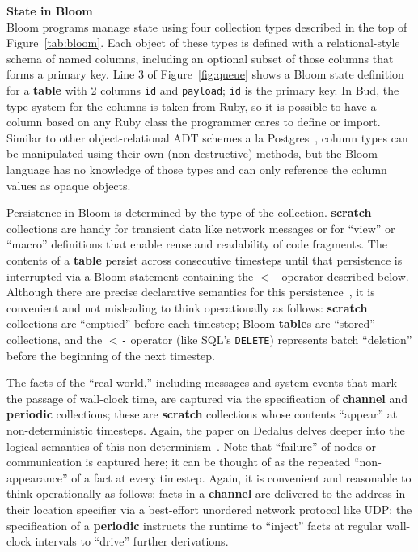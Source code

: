 \noindent\textbf{State in Bloom}\\
\noindent
Bloom programs manage state using four collection types described in the top of Figure~\ref{tab:bloom}. Each object of these types is defined with a relational-style schema of named columns, including an optional subset of those columns that forms a primary key.  Line 3 of Figure~\ref{fig:queue} shows a Bloom state definition for a \textbf{table} with 2 columns \texttt{id} and \texttt{payload}; \texttt{id} is the primary key.  In Bud, the type system for the columns is taken from Ruby, so it is possible to have a column based on any Ruby class the programmer cares to define or import.  Similar to other object-relational ADT schemes a la Postgres~\cite{postgres-adt}, column types can be manipulated using their own (non-destructive) methods, but the Bloom language has no knowledge of those types and can only reference the column values as opaque objects.  

Persistence in Bloom is determined by the type of the collection.  \textbf{scratch} collections are handy for transient data like network messages or for ``view'' or ``macro'' definitions that enable reuse and readability of code fragments.  The contents of a \textbf{table} persist across consecutive timesteps until that persistence is interrupted via a Bloom statement containing the \texttt{$<$-} operator described below. Although there are precise declarative semantics for this persistence~\cite{dedalus-techr}, it is convenient and not misleading to think operationally as follows: \textbf{scratch} collections are ``emptied'' before each timestep; Bloom \textbf{table}s are ``stored'' collections, and the \texttt{$<$-} operator (like SQL's \texttt{DELETE}) represents batch ``deletion'' before the beginning of the next timestep.

The facts of the ``real world,'' including messages and system events that mark the passage of wall-clock time, are captured via the specification of \textbf{channel} and \textbf{periodic} collections; these are \textbf{scratch} collections whose contents ``appear'' at non-deterministic timesteps. 
Again, the paper on Dedalus delves deeper into the logical semantics of this non-determinism~\cite{dedalus-techr}.  Note that ``failure'' of nodes or communication is captured here; it can be thought of as the repeated ``non-appearance'' of a fact at every timestep.  Again, it is convenient and reasonable to think operationally as follows: facts in a \textbf{channel} are delivered to the address in their location specifier via a best-effort unordered network protocol like UDP; the specification of a \textbf{periodic} instructs the runtime to ``inject'' facts at regular wall-clock intervals to ``drive'' further derivations.

